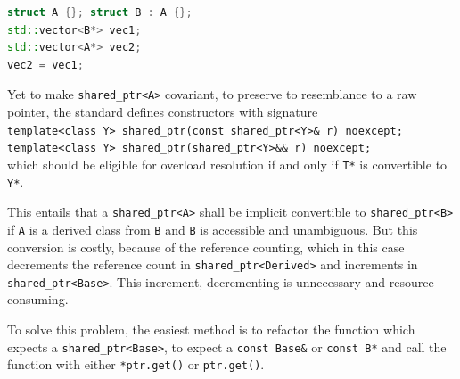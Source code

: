 \begin{lstlisting}[language=c++, frame=single]
struct A {}; struct B : A {};
std::vector<B*> vec1;
std::vector<A*> vec2;
vec2 = vec1;
\end{lstlisting}
\par Yet to make \verb|shared_ptr<A>| covariant, to preserve to resemblance to a raw pointer, the standard defines constructors with signature
\\ \verb|template<class Y> shared_ptr(const shared_ptr<Y>& r) noexcept;|\\
\verb|template<class Y> shared_ptr(shared_ptr<Y>&& r) noexcept;| \\
\cite[\S20.8.2.2.1]{cpp_standard}
which should be eligible for overload resolution if and only if \verb|T*| is convertible to \verb|Y*|. \medskip
\par This entails that a \verb|shared_ptr<A>| shall be implicit convertible to \verb|shared_ptr<B>| if \verb|A| is a derived class from \verb|B| and \verb|B| is accessible and unambiguous. But this conversion is costly, because of the reference counting, which in this case decrements the reference count in \verb|shared_ptr<Derived>| and increments in \verb|shared_ptr<Base>|. This increment, decrementing is unnecessary and resource consuming. \medskip
\par To solve this problem, the easiest method is to refactor the function which expects a \verb|shared_ptr<Base>|, to expect a \verb|const Base&| or \verb|const B*| and call the function with either \verb|*ptr.get()| or \verb|ptr.get()|.
